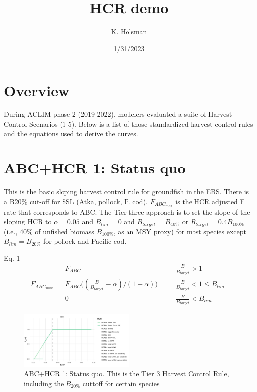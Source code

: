 \documentclass[
]{article}
\title{HCR demo}
\author{K. Holsman}
\date{1/31/2023}
\begin{document}
\maketitle

{
\setcounter{tocdepth}{3}
\tableofcontents
}
\section{Overview}\label{overview}

During ACLIM phase 2 (2019-2022), modelers evaluated a suite of Harvest
Control Scenarios (1-5). Below is a list of those standardized harvest
control rules and the equations used to derive the curves.

\section{ABC+HCR 1: Status quo}\label{abchcr-1-status-quo}

This is the basic sloping harvest control rule for groundfish in the
EBS. There is a B20\% cut-off for SSL (Atka, pollock, P. cod).
\(F_{ABC_{max}}\) is the HCR adjusted F rate that corresponds to ABC.
The Tier three approach is to set the slope of the sloping HCR to
\(\alpha = 0.05\) and \(B_{lim} = 0\) and \(B_{target} = B_{40\%}\) or
\(B_{target} = 0.4B_{100\%}\) (i.e., 40\% of unfished biomass
\(B_{100\%}\), as an MSY proxy) for most species except
\(B_{lim} = B_{20\%}\) for pollock and Pacific cod.

Eq. 1 \[F_{ABC_{max}} = \begin{array}{ll}  
 F_{ABC} &~~~~~~~~ \frac{B}{B_{target}}>1 \\  
 F_{ABC}\dot((\frac{B}{B_{target}}-\alpha)/(1-\alpha)) &~~~~~~~~ \frac{B}{B_{target}} < 1 \leq B_{lim} \\  
 0 &~~~~~~~~ \frac{B}{B_{target}} < B_{lim}  
 \end{array}\]

\begin{figure}
\centering
\includegraphics[width=0.5\textwidth,height=\textheight]{../../Figs/HCR_figs/HCR1.png}
\caption{ABC+HCR 1: Status quo. This is the Tier 3 Harvest Control Rule,
including the \(B_{20\%}\) cuttoff for certain species}
\end{figure}
\end{document}
